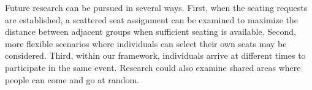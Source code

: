 



Future research can be pursued in several ways. First, when the seating requests are established, a scattered seat assignment can be examined to maximize the distance between adjacent groups when sufficient seating is available. Second, more flexible scenarios where individuals can select their own seats may be considered. Third, within our framework, individuals arrive at different times to participate in the same event. Research could also examine shared areas where people can come and go at random.
